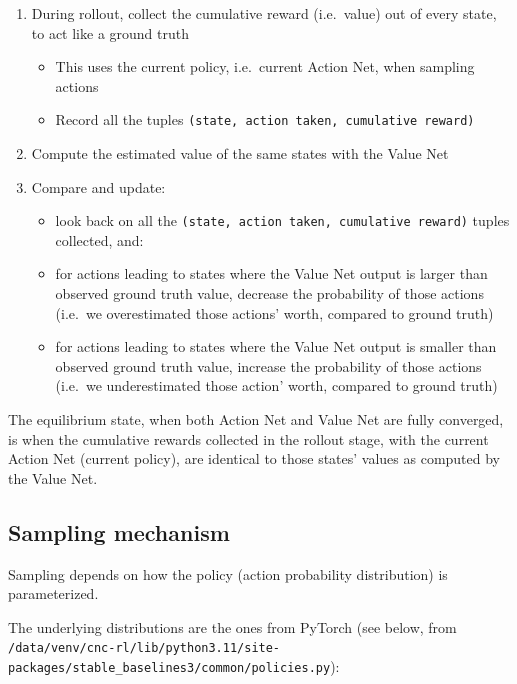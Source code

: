 \documentclass[
  letterpaper,
  DIV=11,
  numbers=noendperiod]{scrartcl}
\providecommand{\tightlist}{%
  \setlength{\itemsep}{0pt}\setlength{\parskip}{0pt}}\usepackage{longtable,booktabs,array}
\begin{document}
\begin{enumerate}
\def\labelenumi{\arabic{enumi}.}
\tightlist
\item
  During rollout, collect the cumulative reward (i.e.~value) out of
  every state, to act like a ground truth

  \begin{itemize}
  \tightlist
  \item
    This uses the current policy, i.e.~current Action Net, when sampling
    actions
  \item
    Record all the tuples
    \texttt{(state,\ action\ taken,\ cumulative\ reward)}
  \end{itemize}
\item
  Compute the estimated value of the same states with the Value Net
\item
  Compare and update:

  \begin{itemize}
  \tightlist
  \item
    look back on all the
    \texttt{(state,\ action\ taken,\ cumulative\ reward)} tuples
    collected, and:
  \item
    for actions leading to states where the Value Net output is larger
    than observed ground truth value, decrease the probability of those
    actions (i.e.~we overestimated those actions' worth, compared to
    ground truth)
  \item
    for actions leading to states where the Value Net output is smaller
    than observed ground truth value, increase the probability of those
    actions (i.e.~we underestimated those action' worth, compared to
    ground truth)
  \end{itemize}
\end{enumerate}

The equilibrium state, when both Action Net and Value Net are fully
converged, is when the cumulative rewards collected in the rollout
stage, with the current Action Net (current policy), are identical to
those states' values as computed by the Value Net.

\subsection{Sampling mechanism}\label{sampling-mechanism}

Sampling depends on how the policy (action probability distribution) is
parameterized.

The underlying distributions are the ones from PyTorch (see below, from
\texttt{/data/venv/cnc-rl/lib/python3.11/site-packages/stable\_baselines3/common/policies.py}):
\end{document}

